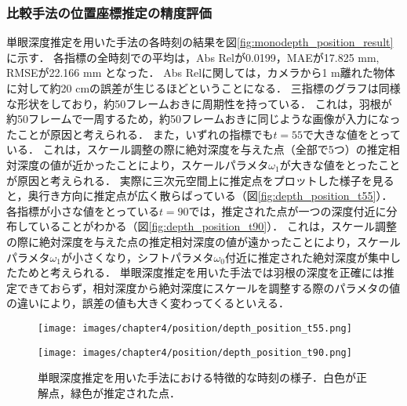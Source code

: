 \subsubsection{比較手法の位置座標推定の精度評価}
単眼深度推定を用いた手法の各時刻の結果を図\ref{fig:monodepth_position_result}に示す．
各指標の全時刻での平均は，Abs Relが0.0199，MAEが17.825 mm, RMSEが22.166 mm となった．
Abs Relに関しては，カメラから1 m離れた物体に対して約20 cmの誤差が生じるほどということになる．
三指標のグラフは同様な形状をしており，約50フレームおきに周期性を持っている．
これは，羽根が約50フレームで一周するため，約50フレームおきに同じような画像が入力になったことが原因と考えられる．
また，いずれの指標でも$t=55$で大きな値をとっている．
これは，スケール調整の際に絶対深度を与えた点（全部で5つ）の推定相対深度の値が近かったことにより，スケールパラメタ$\omega_1$が大きな値をとったことが原因と考えられる．
実際に三次元空間上に推定点をプロットした様子を見ると，奥行き方向に推定点が広く散らばっている（図\ref{fig:depth_position_t55}）．
各指標が小さな値をとっている$t=90$では，推定された点が一つの深度付近に分布していることがわかる（図\ref{fig:depth_position_t90}）．
これは，スケール調整の際に絶対深度を与えた点の推定相対深度の値が遠かったことにより，スケールパラメタ$\omega_1$が小さくなり，シフトパラメタ$\omega_0$付近に推定された絶対深度が集中したためと考えられる．
単眼深度推定を用いた手法では羽根の深度を正確には推定できておらず，相対深度から絶対深度にスケールを調整する際のパラメタの値の違いにより，誤差の値も大きく変わってくるといえる．

\begin{figure}[h]
	\centering
	\begin{minipage}[b]{0.45\hsize}
		\centering
		\texttt{[image: images/chapter4/position/depth\_position\_t55.png]}
		\label{fig:depth_position_t55}
	\end{minipage}
	\begin{minipage}[b]{0.45\hsize}
		\centering
		
		\texttt{[image: images/chapter4/position/depth\_position\_t90.png]}
		\label{fig:depth_position_t90}
	\end{minipage}
	\caption[単眼深度推定を用いた手法における特徴的な時刻の様子]{単眼深度推定を用いた手法における特徴的な時刻の様子．白色が正解点，緑色が推定された点．}
	\label{fig:monodepth_position2}
\end{figure}


